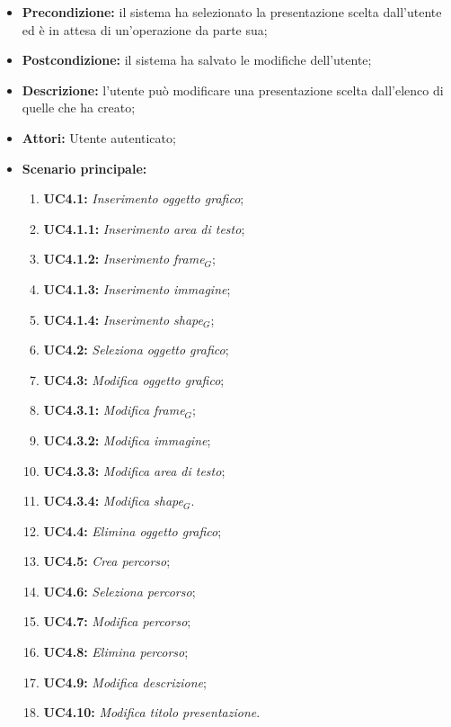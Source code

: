 \begin{itemize}
	\item \textbf{Precondizione:} il sistema ha selezionato la presentazione scelta dall'utente ed è in attesa di un'operazione da parte sua;
	\item \textbf{Postcondizione:} il sistema ha salvato le modifiche dell'utente;
	\item \textbf{Descrizione:} l'utente può modificare una presentazione scelta dall'elenco di quelle che ha creato;
	\item \textbf{Attori:} Utente autenticato;
	\item \textbf{Scenario principale:}
	\begin{enumerate}
		\item \textbf{ UC4.1:} \textit{ Inserimento oggetto grafico};
		\item \textbf{ UC4.1.1:} \textit{ Inserimento area di testo};
		\item \textbf{ UC4.1.2:} \textit{ Inserimento frame$_G$};
		\item \textbf{ UC4.1.3:} \textit{ Inserimento immagine};
		\item \textbf{ UC4.1.4:} \textit{ Inserimento shape$_G$};
		\item \textbf{ UC4.2:} \textit{ Seleziona oggetto grafico};
		\item \textbf{ UC4.3:} \textit{ Modifica oggetto grafico};
		\item \textbf{ UC4.3.1:} \textit{ Modifica frame$_G$};
		\item \textbf{ UC4.3.2:} \textit{ Modifica immagine};
		\item \textbf{ UC4.3.3:} \textit{ Modifica area di testo};
		\item \textbf{ UC4.3.4:} \textit{ Modifica shape$_G$}.
		\item \textbf{ UC4.4:} \textit{ Elimina oggetto grafico};
		\item \textbf{ UC4.5:} \textit{ Crea percorso};
		\item \textbf{ UC4.6:} \textit{ Seleziona percorso};
		\item \textbf{ UC4.7:} \textit{ Modifica percorso};
		\item \textbf{ UC4.8:} \textit{ Elimina percorso};
		\item \textbf{ UC4.9:} \textit{ Modifica descrizione};
		\item \textbf{ UC4.10:} \textit{ Modifica titolo presentazione}.
	\end{enumerate}
\end{itemize}
